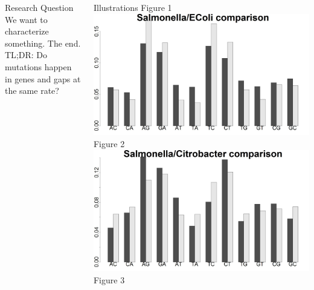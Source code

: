 \documentclass[final]{beamer}
\begin{document}
\begin{frame}{}
\begin{columns}[t]
\begin{column}{.32 \linewidth}
 \begin{block}{\large Research Question}
	{\color{red} We want to characterize something. }
                       The end.
                       \newline
                       TL;DR: Do mutations happen in genes and gaps at the same rate?
	\end{block}

\end{column}


\begin{column}{.32 \linewidth}

\begin{block}{\large Illustrations}
Figure 1
	\includegraphics[scale = .455]{SalECPercentage.jpeg}
	\newline
Figure 2
 \includegraphics[scale = .455]{CBSalPercentage.jpeg}
 \newline
Figure 3

\end{block}
\end{column}
\end{columns}
\end{frame}
\end{document}
